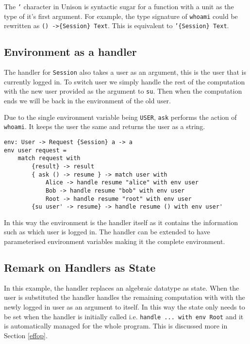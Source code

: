 \documentclass[logo,bsc,singlespacing,parskip]{infthesis}
\begin{document}
The \texttt{'} character in Unison is syntactic sugar for a function with a
unit as the type of it's first argument. For example, the type signature of 
\texttt{whoami} could be rewritten as \texttt{() ->\{Session\} Text}. This is 
equivalent to \texttt{'\{Session\} Text}.

\subsection{Environment as a handler}

The handler for \texttt{Session} also takes a user as an argument, this is the
user that is currently logged in. To switch user we simply handle the rest of
the computation with the new user provided as the argument to \texttt{su}. Then
when the computation ends we will be back in the environment of the old user.

Due to the single environment variable being \texttt{USER}, \texttt{ask}
performs the action of \texttt{whoami}. It keeps the user the same and returns
the user as a string.

\begin{lstlisting}[language=unison]
env: User -> Request {Session} a -> a
env user request = 
    match request with
        {result} -> result
        { ask () -> resume } -> match user with 
            Alice -> handle resume "alice" with env user
            Bob -> handle resume "bob" with env user
            Root -> handle resume "root" with env user
        {su user' -> resume} -> handle resume () with env user'
\end{lstlisting}

In this way the environment is the handler itself as it contains the
information such as which user is logged in. The handler can be extended to
have parameterised environment variables making it the complete environment.

\subsection{Remark on Handlers as State}

In this example, the handler replaces an algebraic datatype as state. When the
user is substituted the handler handles the remaining computation with with the
newly logged in user as an argument to itself. In this way the state only needs
to be set when the handler is initially called i.e. \texttt{handle ... with env
Root} and it is automatically managed for the whole program. This is discussed
more in Section \ref{effop}.
\end{document}
